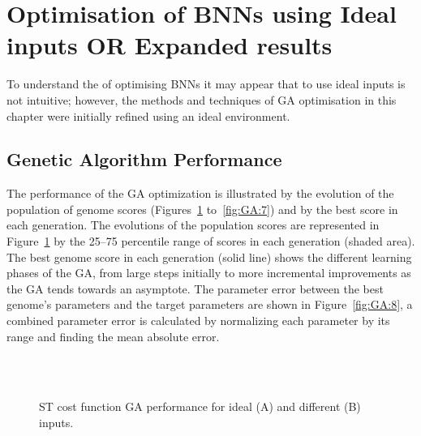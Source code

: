 \section{Optimisation of BNNs using Ideal inputs \textbf{OR} Expanded results}

To understand the of optimising BNNs it may appear that to use ideal
inputs is not intuitive; however, the methods and techniques of GA
optimisation in this chapter were initially refined using an ideal
environment.



\subsection{Genetic Algorithm Performance}



The performance of the GA optimization is illustrated by the evolution
of the population of genome scores (Figures~\ref{fig:GA:5}
to~\ref{fig:GA:7}) and by the best score in each generation. The
evolutions of the population scores are represented in
Figure~\ref{fig:GA:5} by the 25--75 percentile range of scores in each
generation (shaded area). The best genome score in each generation
(solid line) shows the different learning phases of the GA, from large
steps initially to more incremental improvements as the GA tends
towards an asymptote. The parameter error between the best genome's
parameters and the target parameters are shown in Figure~\ref{fig:GA:8},
a combined parameter error is calculated by normalizing each parameter
by its range and finding the mean absolute error.

\smallskip{}

\begin{figure}[htb]
\centering
{}\hspace{2.2in} \hfill \\
\hfill\\
 \caption{ST cost function GA performance for ideal (A) and different (B) inputs.}\label{fig:GA:5}
\end{figure}

\begin{figure}[ht!]
\centering
{}\hspace{2.2in} \hfill \\
\hfill\\
 \caption{}\label{fig:GA:6}
\end{figure}

